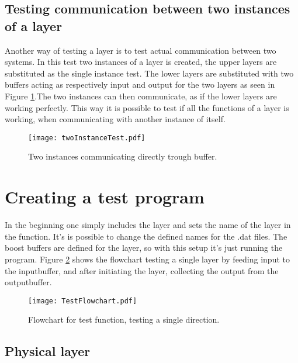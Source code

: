 \subsection{Testing communication between two instances of a layer}

Another way of testing a layer is to test actual communication between two systems. In this test two instances of a layer is created, the upper layers are substituted as the single instance test. The lower layers are substituted with two buffers acting as respectively  input and output for the two layers as seen in Figure \ref{fig:twoInstanceTest}.The two instances can then communicate, as if the lower layers are working perfectly. This way it is possible to test if all the functions of a layer is working, when communicating with another instance of itself.




\begin{figure}[htb]
	\begin{center}
	\texttt{[image: twoInstanceTest.pdf]}%
	\caption{Two instances communicating directly trough buffer.}
	\label{fig:twoInstanceTest}	
	\end{center}
\end{figure}



\section{Creating a test program}
In the beginning one simply includes the layer and sets the name of the layer in the function. It's is possible to change the defined names for the .dat files. The boost buffers are defined for the layer, so with this setup it's just running the program.
Figure \ref{fig:TestFlowchart} shows the flowchart testing a single layer by feeding input to the inputbuffer, and after initiating the layer, collecting the output from the outputbuffer. 


\begin{figure}[htb]
	\begin{center}
	\texttt{[image: TestFlowchart.pdf]}
	\caption{Flowchart for test function, testing a single direction.}
	\label{fig:TestFlowchart}	
	\end{center}
\end{figure}

\subsection{Physical layer}

